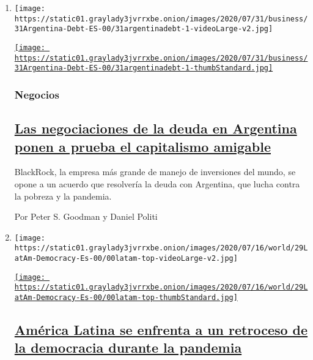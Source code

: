 \begin{enumerate}
\def\labelenumi{\arabic{enumi}.}
\item
  \texttt{[image: https://static01.graylady3jvrrxbe.onion/images/2020/07/31/business/31Argentina-Debt-ES-00/31argentinadebt-1-videoLarge-v2.jpg]}

  \href{/es/2020/07/31/espanol/negocios/argentina-deuda.html}{\texttt{[image: https://static01.graylady3jvrrxbe.onion/images/2020/07/31/business/31Argentina-Debt-ES-00/31argentinadebt-1-thumbStandard.jpg]}}

  \hypertarget{negocios}{%
  \subsubsection{Negocios}\label{negocios}}

  \hypertarget{las-negociaciones-de-la-deuda-en-argentina-ponen-a-prueba-el-capitalismo-amigable}{%
  \subsection{\texorpdfstring{\href{/es/2020/07/31/espanol/negocios/argentina-deuda.html}{Las
  negociaciones de la deuda en Argentina ponen a prueba el capitalismo
  amigable}}{Las negociaciones de la deuda en Argentina ponen a prueba el capitalismo amigable}}\label{las-negociaciones-de-la-deuda-en-argentina-ponen-a-prueba-el-capitalismo-amigable}}

  BlackRock, la empresa más grande de manejo de inversiones del mundo,
  se opone a un acuerdo que resolvería la deuda con Argentina, que lucha
  contra la pobreza y la pandemia.

  Por Peter S. Goodman y Daniel Politi
\item
  \texttt{[image: https://static01.graylady3jvrrxbe.onion/images/2020/07/16/world/29LatAm-Democracy-Es-00/00latam-top-videoLarge-v2.jpg]}

  \href{/es/2020/07/29/espanol/america-latina/democracia-america-latina-pandemia.html}{\texttt{[image: https://static01.graylady3jvrrxbe.onion/images/2020/07/16/world/29LatAm-Democracy-Es-00/00latam-top-thumbStandard.jpg]}}

  \hypertarget{amuxe9rica-latina-se-enfrenta-a-un-retroceso-de-la-democracia-durante-la-pandemia}{%
  \subsection{\texorpdfstring{\href{/es/2020/07/29/espanol/america-latina/democracia-america-latina-pandemia.html}{América
  Latina se enfrenta a un retroceso de la democracia durante la
  pandemia}}{América Latina se enfrenta a un retroceso de la democracia durante la pandemia}}\label{amuxe9rica-latina-se-enfrenta-a-un-retroceso-de-la-democracia-durante-la-pandemia}}


\end{enumerate}
